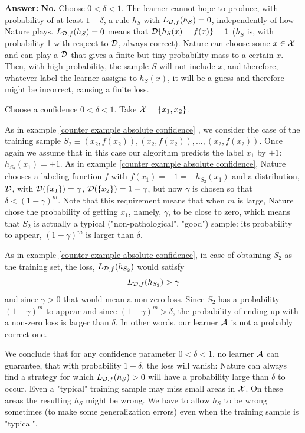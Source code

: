 {\textbf{Answer:} {\bf No.} Choose $0<\delta<1$. The learner cannot 	hope to produce, with probability of at least $1-\delta$, a rule $h_S$ with $L_{\mathcal{D},f}(h_S)=0$, independently of how Nature plays.  $L_{\mathcal{D},f}(h_S)=0$ means that $\mathcal{D}\{h_S(x)= f(x)\}=1$ ($h_S$ is, with probability 1 with respect to $\mathcal{D}$, always correct). 	Nature can choose some $x\in\mathcal{X}$ and can play a $\mathcal{D}$ that gives a finite but tiny probability mass to a certain $x$. Then, with high probability, the sample $S$ will not include $x$, and therefore, whatever label the learner assigns to $h_S(x)$, it will be a guess and therefore might be incorrect, causing a finite loss.
	
\begin{example} \label{counter example absolute accuracy}
	Choose a confidence $0<\delta <1$. Take $\mathcal{X}=\left\{ x_1,x_2 \right\}$. 
	
	As in example \ref{counter example absolute confidence} , we consider the case of the training sample $S_2\equiv (x_2,f(x_2)), (x_2,f(x_2)),..., (x_2,f(x_2))$. 
	Once again we assume that in this case our algorithm predicts the label $x_1$ by $+1$:  $h_{S_2}(x_1)=+1$.
	As in example \ref{counter example absolute confidence}, Nature chooses a labeling function $f$ with  $f(x_1)=-1=-h_{S_2}(x_1)$ and a distribution, $\mathcal{D}$, with	$\mathcal{D}(\{x_1\}) = \gamma$, $\mathcal{D}(\{x_2\}) = 1-\gamma$, but now $\gamma$ is chosen so that  $\delta<(1-\gamma)^m$. Note that this requirement means that when $m$ is large, Nature chose the probability of getting $x_1$, namely, $\gamma$, to be close to zero, which means that $S_2$ is actually a typical ("non-pathological", "good") sample: its probability to appear, $(1-\gamma)^m$ is larger than $\delta$.
	
	As in example \ref{counter example absolute confidence}, in case of obtaining  $S_2$ as the training set,  the loss, $L_{\mathcal{D},f}(h_{S_2})$ would satisfy
	$$L_{\mathcal{D},f}(h_{S_2})>\gamma$$ and since $\gamma>0$ that would mean a non-zero loss. 
  Since $S_2$ has a probability $(1-\gamma)^m$ to appear and since $(1-\gamma)^m >\delta$, the probability of ending up with a non-zero loss is larger than $\delta$.
  In other words, our learner $\mathcal{A}$ is not a probably correct one. 
\end{example}
	
	We conclude that for any confidence parameter  $0<\delta<1$, no learner $\mathcal{A}$ can guarantee, that with probability $1-\delta$, the loss will vanish: Nature can always find a strategy for which $L_{\mathcal{D},f}(h_S) > 0$ will have a probability large than $\delta$ to occur. Even a "typical"  training sample may miss small areas in $\mathcal{X}$. On these areas
	the resulting $h_S$ might be wrong. We have to allow $h_S$ to be wrong sometimes (to make some generalization errors) even when the training sample is "typical".
	
}
